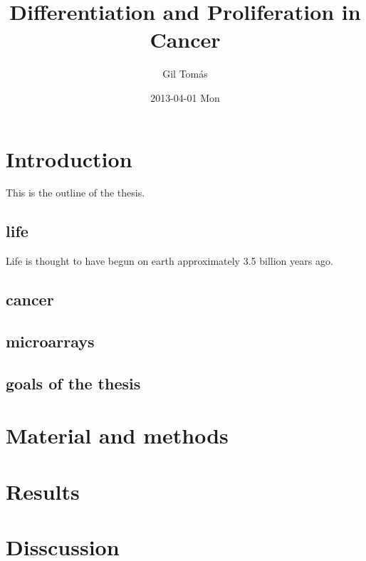 \documentclass[11pt]{article}
\title{Differentiation and Proliferation in Cancer}
\author{Gil Tomás}
\date{2013-04-01 Mon}
\begin{document}
\maketitle

\setcounter{tocdepth}{3}
\tableofcontents
\vspace*{1cm}

\section{Introduction}
\label{sec-1}

This is the outline of the thesis.
\subsection{life}
\label{sec-1.1}

Life is thought to have begun on earth approximately 3.5 billion years ago.
\subsection{cancer}
\label{sec-1.2}

\subsection{microarrays}
\label{sec-1.3}

\subsection{goals of the thesis}
\label{sec-1.4}

\section{Material and methods}
\label{sec-2}

\section{Results}
\label{sec-3}

\section{Disscussion}
\label{sec-4}
\end{document}
